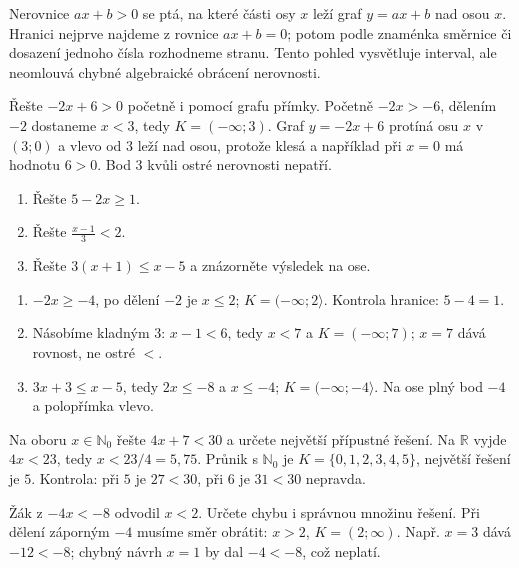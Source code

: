 \documentclass[11pt,a4paper]{article}
\begin{document}
Nerovnice $ax+b>0$ se ptá, na které části osy $x$ leží graf $y=ax+b$ nad osou $x$. Hranici nejprve najdeme z rovnice $ax+b=0$; potom podle znaménka směrnice či dosazení jednoho čísla rozhodneme stranu. Tento pohled vysvětluje interval, ale neomlouvá chybné algebraické obrácení nerovnosti.
\begin{prikladReseniBox}
Řešte $-2x+6>0$ početně i pomocí grafu přímky.
\tcblower
Početně $-2x>-6$, dělením $-2$ dostaneme $x<3$, tedy $K=(-\infty;3)$. Graf $y=-2x+6$ protíná osu $x$ v $(3;0)$ a vlevo od $3$ leží nad osou, protože klesá a například při $x=0$ má hodnotu $6>0$. Bod $3$ kvůli ostré nerovnosti nepatří.
\end{prikladReseniBox}
\begin{zadaniReseniBox}
\begin{enumerate}[label=\alph*)]
\item Řešte $5-2x\ge1$.
\item Řešte $\frac{x-1}{3}<2$.
\item Řešte $3(x+1)\le x-5$ a znázorněte výsledek na ose.
\end{enumerate}
\tcblower
\begin{enumerate}[label=\alph*)]
\item $-2x\ge-4$, po dělení $-2$ je $x\le2$; $K=(-\infty;2\rangle$. Kontrola hranice: $5-4=1$.
\item Násobíme kladným $3$: $x-1<6$, tedy $x<7$ a $K=(-\infty;7)$; $x=7$ dává rovnost, ne ostré $<$.
\item $3x+3\le x-5$, tedy $2x\le-8$ a $x\le-4$; $K=(-\infty;-4\rangle$. Na ose plný bod $-4$ a polopřímka vlevo.
\end{enumerate}
\end{zadaniReseniBox}
\begin{zadaniReseniBox}
Na oboru $x\in\mathbb N_0$ řešte $4x+7<30$ a určete největší přípustné řešení.
\tcblower
Na $\mathbb R$ vyjde $4x<23$, tedy $x<23/4=5{,}75$. Průnik s $\mathbb N_0$ je $K=\{0,1,2,3,4,5\}$, největší řešení je $5$. Kontrola: při $5$ je $27<30$, při $6$ je $31<30$ nepravda.
\end{zadaniReseniBox}
\begin{zadaniReseniBox}
Žák z $-4x<-8$ odvodil $x<2$. Určete chybu i správnou množinu řešení.
\tcblower
Při dělení záporným $-4$ musíme směr obrátit: $x>2$, $K=(2;\infty)$. Např. $x=3$ dává $-12<-8$; chybný návrh $x=1$ by dal $-4<-8$, což neplatí.
\end{zadaniReseniBox}
\end{document}
